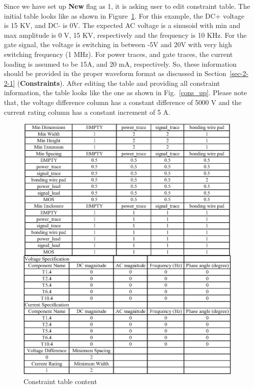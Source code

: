 \documentclass[11pt]{article}
\begin{document}
\begin{enumerate}
    Since we have set up \textbf{New} flag as 1, it is asking user to edit constraint table. The initial table looks like as shown in Figure~\ref{cons_init}. For this example, the DC+ voltage is 15 KV, and DC- is 0V. The expected AC voltage is a sinusoid with min and max amplitude is 0 V, 15 KV, respectively and the frequency is 10 KHz. For the gate signal, the voltage is switching in between -5V and 20V with very high switching frequency (1 MHz). For power traces, and gate traces, the current loading is assumed to be 15A, and 20 mA, respectively.
    So, these information should be provided in the proper waveform format as discussed in Section~\ref{sec-2-2-1} (\textbf{Constraints}). 
    After editing the table and providing all constraint information, the table looks like the one as shown in Fig.~\ref{cons_up}. Please note that, the voltage difference column has a constant difference of 5000 V and the current rating column has a constant increment of 5 A.
    \begin{figure}[H]
    \centering
    \includegraphics[width=\linewidth ]{figs/v_1.9_figs/Cons_init.eps}
    \caption{Constraint table content}
    \label{cons_init}
    \end{figure}
    

\end{enumerate}
\end{document}
